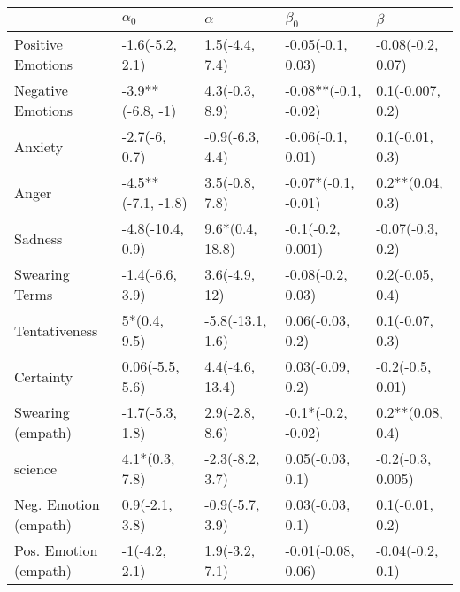 \begin{tabular}{lllll}
\toprule
{} &          $\alpha_0$ &          $\alpha$ &             $\beta_0$ &            $\beta$ \\
\midrule
Positive Emotions     &     -1.6(-5.2, 2.1) &    1.5(-4.4, 7.4) &     -0.05(-0.1, 0.03) &  -0.08(-0.2, 0.07) \\
Negative Emotions     &    -3.9**(-6.8, -1) &    4.3(-0.3, 8.9) &  -0.08**(-0.1, -0.02) &   0.1(-0.007, 0.2) \\
Anxiety               &       -2.7(-6, 0.7) &   -0.9(-6.3, 4.4) &     -0.06(-0.1, 0.01) &    0.1(-0.01, 0.3) \\
Anger                 &  -4.5**(-7.1, -1.8) &    3.5(-0.8, 7.8) &   -0.07*(-0.1, -0.01) &   0.2**(0.04, 0.3) \\
Sadness               &    -4.8(-10.4, 0.9) &   9.6*(0.4, 18.8) &     -0.1(-0.2, 0.001) &   -0.07(-0.3, 0.2) \\
Swearing Terms        &     -1.4(-6.6, 3.9) &     3.6(-4.9, 12) &     -0.08(-0.2, 0.03) &    0.2(-0.05, 0.4) \\
Tentativeness         &        5*(0.4, 9.5) &  -5.8(-13.1, 1.6) &      0.06(-0.03, 0.2) &    0.1(-0.07, 0.3) \\
Certainty             &     0.06(-5.5, 5.6) &   4.4(-4.6, 13.4) &      0.03(-0.09, 0.2) &   -0.2(-0.5, 0.01) \\
Swearing (empath)     &     -1.7(-5.3, 1.8) &    2.9(-2.8, 8.6) &    -0.1*(-0.2, -0.02) &   0.2**(0.08, 0.4) \\
science               &      4.1*(0.3, 7.8) &   -2.3(-8.2, 3.7) &      0.05(-0.03, 0.1) &  -0.2(-0.3, 0.005) \\
Neg. Emotion (empath) &      0.9(-2.1, 3.8) &   -0.9(-5.7, 3.9) &      0.03(-0.03, 0.1) &    0.1(-0.01, 0.2) \\
Pos. Emotion (empath) &       -1(-4.2, 2.1) &    1.9(-3.2, 7.1) &    -0.01(-0.08, 0.06) &   -0.04(-0.2, 0.1) \\
\bottomrule
\end{tabular}
